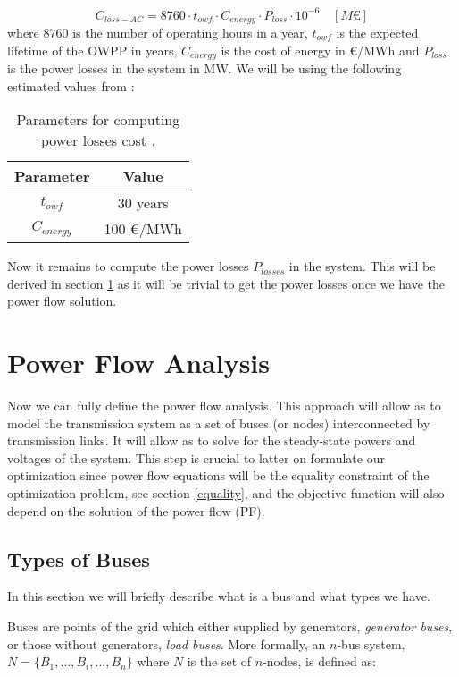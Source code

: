 \documentclass[a4paper,11pt, titlepage, twoside]{article}
\begin{document}
\begin{equation}\label{eq:lossescost}
    C_{loss-AC} = 8760 \cdot t_{owf} \cdot C_{energy} \cdot P_{loss} \cdot 10^{-6} \quad \left[M\euro\right]
\end{equation}
where $8760$ is the number of operating hours in a year, $t_{owf}$ is the expected lifetime of the OWPP in years, $C_{energy}$ is the cost of energy in \euro/MWh and $P_{loss}$ is the power losses in the system in MW. We will be using the
following estimated values from \cite{paperbase}:
\begin{table}[h]
    \centering
    \begin{tabular}{c|c}
    \hline
    \textbf{Parameter} & \textbf{Value} \\
    \hline
    $t_{owf}$ & 30 years \\ 
    $C_{energy}$ & 100 \euro/MWh  \\
    \hline
    \end{tabular}
    \caption{Parameters for computing power losses cost \cite{paperbase}.}
    \label{tab:lossescost}
\end{table}

Now it remains to compute the power losses $P_{losses}$ in the system. This will be derived in section \ref{fulltransmission} as it will be trivial to get
the power losses once we have the power flow solution.

\section{Power Flow Analysis} \label{fulltransmission}

Now we can fully define the power flow analysis.  This approach will allow as to model the transmission system as a set of buses (or nodes)
interconnected by transmission links. It will allow as to solve for the steady-state powers and voltages of the system. This step is crucial to latter on
formulate our optimization since power flow equations will be the equality constraint of the optimization problem,  see section \ref{equality}, and the objective function will also depend on the solution of the power flow (PF).

\subsection{Types of Buses}

In this section we will briefly describe what is a bus and what types we have.\par
Buses are points of the grid which either supplied by generators, \textit{generator buses}, or those without generators, \textit{load buses}. More formally, an $n$-bus system, $N=\{B_1,...,B_i,...,B_n\}$ where $N$ is the set of $n$-nodes, is defined as:
\end{document}
